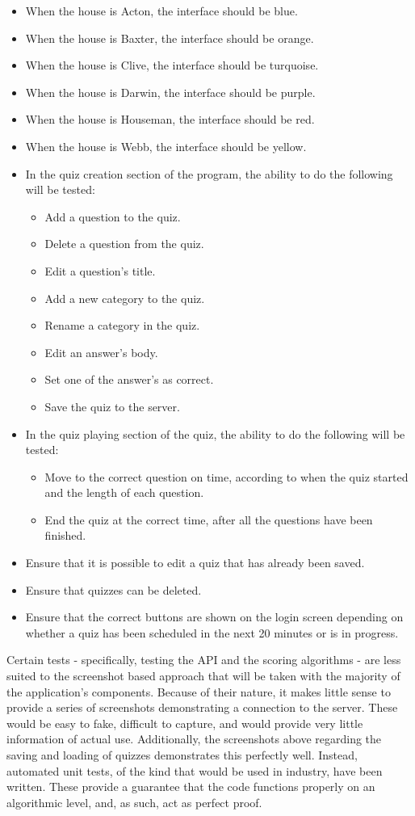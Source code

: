 \begin{itemize}
  \item When the house is Acton, the interface should be blue.
  \item When the house is Baxter, the interface should be orange.
  \item When the house is Clive, the interface should be turquoise.
  \item When the house is Darwin, the interface should be purple.
  \item When the house is Houseman, the interface should be red.
  \item When the house is Webb, the interface should be yellow.
  \item In the quiz creation section of the program, the ability to do the following will be tested:
  \begin{itemize}
    \item Add a question to the quiz.
    \item Delete a question from the quiz.
    \item Edit a question's title.
    \item Add a new category to the quiz.
    \item Rename a category in the quiz.
    \item Edit an answer's body.
    \item Set one of the answer's as correct.
    \item Save the quiz to the server.
  \end{itemize}
  \item In the quiz playing section of the quiz, the ability to do the following will be tested:
  \begin{itemize}
    \item Move to the correct question on time, according to when the quiz started and the length of each question.
    \item End the quiz at the correct time, after all the questions have been finished.
  \end{itemize}
  \item Ensure that it is possible to edit a quiz that has already been saved.
  \item Ensure that quizzes can be deleted.
  \item Ensure that the correct buttons are shown on the login screen depending on whether a quiz has been scheduled in the next 20 minutes or is in progress.
\end{itemize}

Certain tests - specifically, testing the API and the scoring algorithms - are less suited to the screenshot based approach that will be taken with the majority of the application's components. Because of their nature, it makes little sense to provide a series of screenshots demonstrating a connection to the server. These would be easy to fake, difficult to capture, and would provide very little information of actual use. Additionally, the screenshots above regarding the saving and loading of quizzes demonstrates this perfectly well. Instead, automated unit tests, of the kind that would be used in industry, have been written. These provide a guarantee that the code functions properly on an algorithmic level, and, as such, act as perfect proof.
